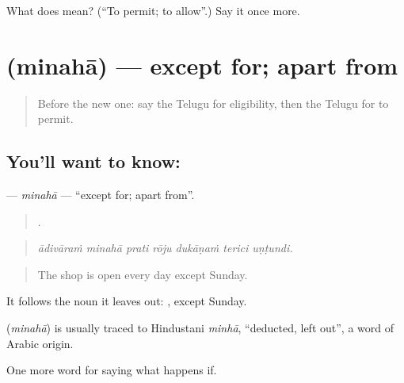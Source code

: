 \begin{tcolorbox}[breakable,colback=teal!4,colframe=teal!35!black,title={Before you move on}]
What does  mean? (\textquotedblleft{}To permit; to allow\textquotedblright{}.) Say it once more.
\end{tcolorbox}
\section[\texorpdfstring{\te{మినహా} (minahā)}{మినహా (minahā)}]{ (minahā) — except for; apart from}

\label{lesson:TE-C417-minaha}



\begin{quote}
Before the new one: say the Telugu for eligibility, then the Telugu for to permit.
\end{quote}

\subsection*{You'll want to know: }
\textbf{} — \emph{minahā} — \textquotedblleft{}except for; apart from\textquotedblright{}.

\begin{quote}
      .
\end{quote}

\begin{quote}
\emph{ādivāraṁ minahā prati rōju dukāṇaṁ terici uṇṭundi.}
\end{quote}

\begin{quote}
The shop is open every day except Sunday.
\end{quote}

It follows the noun it leaves out:  , except Sunday.

\begin{cousinweb}
\textbf{} (\emph{minahā}) is usually traced to Hindustani \emph{minhā}, \textquotedblleft{}deducted, left out\textquotedblright{}, a word of Arabic origin.
\end{cousinweb}

\begin{grammarlens}[title={What you've built}]
One more word for saying what happens if.
\end{grammarlens}

